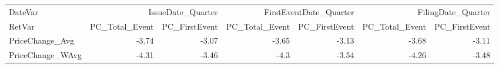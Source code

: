 \begin{tabular}{lrrrrrr}
\toprule
DateVar & \multicolumn{2}{r}{IssueDate\_Quarter} & \multicolumn{2}{r}{FirstEventDate\_Quarter} & \multicolumn{2}{r}{FilingDate\_Quarter} \\
RetVar & PC\_Total\_Event & PC\_FirstEvent & PC\_Total\_Event & PC\_FirstEvent & PC\_Total\_Event & PC\_FirstEvent \\
\midrule
PriceChange\_Avg & -3.74 & -3.07 & -3.65 & -3.13 & -3.68 & -3.11 \\
PriceChange\_WAvg & -4.31 & -3.46 & -4.3 & -3.54 & -4.26 & -3.48 \\
\bottomrule
\end{tabular}
